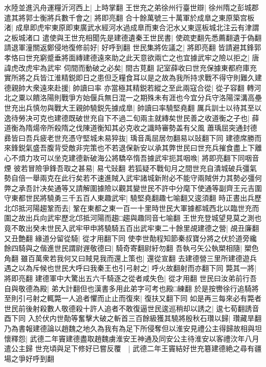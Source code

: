 水陸並進汎舟運糧沂河西上|{
	上時掌翻}
王世充之弟徐州行臺世辯|{
	徐州隋之彭城郡}
遣其將郭士衡將兵數千會之|{
	將即亮翻}
合十餘萬號三十萬軍於成臯之東原築宫板渚|{
	成臯即虎牢東原即東廣武水經河水過成臯而東合汜水乂東逕板城北注云有津謂之板城渚口}
遣使與王世充相聞先是建德遺秦王世民書|{
	使疏吏翻先悉薦翻遺于偽翻}
請退軍潼關返鄭侵地復修前好|{
	好呼到翻}
世民集將佐議之|{
	將即亮翻}
皆請避其鋒郭孝恪曰世充窮蹙垂將面縳建德遠來助之此天意欲兩亡之也宜據武牢之險以拒之|{
	唐諱虎改虎牢為武牢}
伺間而動破之必矣|{
	間古莧翻}
記室薛收曰世充保據東都府庫充實所將之兵皆江淮精鋭即日之患但乏糧食耳以是之故為我所持求戰不得守則難久建德親帥大衆遠來赴援|{
	帥讀曰率}
亦當極其精鋭若縱之至此兩寇合從|{
	從子容翻}
轉河北之粟以饋洛陽則戰爭方始偃兵無日混一之期殊未有涯也今宜分兵守洛陽深溝高壘世充出兵慎勿與戰大王親帥驍鋭先據成臯|{
	帥讀曰率驍堅堯翻}
厲兵訓士以待其至以逸待勞决可克也建德既破世充自下不過二旬兩主就縳矣世民善之收道衡之子也|{
	薛道衡為隋煬帝所殺隋之伐陳道衡知其必克收之識時審勢盖有父風}
蕭瑀屈突通封德彞皆曰吾兵疲老世充憑守堅城未易猝抜|{
	瑀音禹屈居勿翻易以䜴翻下同}
建德席勝而來鋒鋭氣盛吾腹背受敵非完策也不若退保新安以承其弊世民曰世充兵摧食盡上下離心不煩力攻可以坐克建德新破海公將驕卒惰吾據武牢扼其咽㗋|{
	將即亮翻下同咽音煙}
彼若冒險爭鋒吾取之甚易|{
	易弋䜴翻}
若狐疑不戰旬月之間世充自潰城破兵彊氣勢自倍一舉兩克在此行矣若不速進賊入武牢諸城新附必不能守兩賊併力其勢必彊何弊之承吾計决矣通等又請解圍據險以觀其變世民不許中分麾下使通等副齊王元吉圍守東都世民將驍勇三千五百人東趣武牢|{
	驍堅堯翻趣七喻翻又逡須翻}
時正晝出兵歷北邙抵河陽趨鞏而去|{
	鞏在東都之東一百一十里時世民大軍據都城西北以臨世充而圍之故出兵向武牢歷北邙抵河陽而趨□趨與趣同音七喻翻}
王世充登城望見莫之測也竟不敢出癸未世民入武牢甲申將驍騎五百出武牢東二十餘里覘建德之營|{
	覘丑廉翻又丑艶翻}
緣道分留從騎|{
	從才用翻下同}
使李世勣程知節秦叔寶分將之伏於道旁纔餘四騎與之偕進世民謂尉遟敬德曰|{
	騎奇寄翻尉紆勿翻}
吾執弓矢公執槊相隨|{
	槊色角翻}
雖百萬衆若我何又曰賊見我而還上策也|{
	還從宣翻}
去建德營三里所建德遊兵遇之以為斥候也世民大呼曰我秦王也引弓射之|{
	呼火故翻射而亦翻下同}
斃其一將|{
	將即亮翻}
建德軍中大驚出五六千騎逐之從者咸失色|{
	從才用翻}
世民曰汝弟前行吾自與敬德為殿|{
	弟大計翻但也漢書多用此弟字可考也殿□練翻}
於是按轡徐行追騎將至則引弓射之輒斃一人追者懼而止止而復來|{
	復扶又翻下同}
如是再三每來必有斃者世民前後射殺數人敬德殺十許人追者不敢復逼世民逡巡稍却以誘之|{
	逡七荀翻誘音酉下同}
入於伏内世勣等奮擊大破之斬首三百餘級獲其驍將殷秋石瓚以歸|{
	瓚藏旱翻}
乃為書報建德論以趙魏之地久為我有為足下所侵奪但以淮安見禮公主得歸故相與坦懷釋怨|{
	武德二年竇建德盡取趙魏虜淮安王神通及同安公主待淮安以客禮㳄年八月遣公主歸}
世充頃與足下修好已嘗反覆　|{
	武德二年王竇結好世充簒建德絶之尋有疆場之爭好呼到翻}
